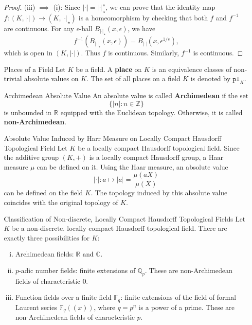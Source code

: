 \begin{proof}
    (iii) $\implies$ (i): Since $|\cdot| = |\cdot|_\star^s$, we can prove that the identity map $f: (K, |\cdot|)\to (K, |\cdot|_\star)$ is a homeomorphism by checking that both $f$ and $f^{-1}$ are continuous. For any $\epsilon$-ball $B_{|\cdot|_\star}(x,\epsilon)$, we have
    \[
    f^{-1}(B_{|\cdot|_\star}(x,\epsilon)) = B_{|\cdot|}(x,\epsilon^{1/s}),
    \]
    which is open in $(K, |\cdot|)$. Thus $f$ is continuous. Similarly, $f^{-1}$ is continuous.
\end{proof}

\begin{definition}{Places of a Field}{}
    Let $K$ be a field. A \textbf{place} on $K$ is an equivalence classes of non-trivial absolute values on $K$. The set of all places on a field $K$ is denoted by $\mathtt{pl}_K$.
\end{definition}

\begin{definition}{Archimedean Absolute Value}{}
    An absolute value is called \textbf{Archimedean} if the set
    \[
    \{|n| : n \in \mathbb{Z}\}
    \] 
    is unbounded in $\mathbb{R}$ equipped with the Euclidean topology. Otherwise, it is called \textbf{non-Archimedean}.
\end{definition}


\begin{example}{Absolute Value Induced by Harr Measure on Locally Compact Hausdorff Topological Field}{}
    Let $K$ be a locally compact Hausdorff topological field. Since the additive group $(K, +)$ is a locally compact Hausdorff group, a Haar measure $\mu $ can be defined on it. Using the Haar measure, an absolute value 
    $$ 
    |\cdot| : a \longmapsto |a| = \frac{\mu(aX)}{\mu(X)} 
    $$ 
    can be defined on the field $K$. The topology induced by this absolute value coincides with the original topology of $K$.
\end{example}

\begin{proposition}{Classification of Non-discrete, Locally Compact Hausdorff Topological Fields}{}
    Let $K$ be a non-discrete, locally compact Hausdorff topological field. There are exactly three possibilities for $K$:
\begin{enumerate}[(i)]
    \item Archimedean fields: $\mathbb{R}$ and $\mathbb{C}$.
    \item $p$-adic number fields: finite extensions of $\mathbb{Q}_p$. These are non-Archimedean fields of characteristic 0.
    \item Function fields over a finite field $\mathbb{F}_q$: finite extensions of the field of formal Laurent series $\mathbb{F}_q(\!(x)\!)$, where $q = p^n$ is a power of a prime. These are non-Archimedean fields of characteristic $p$.
\end{enumerate}
\end{proposition}


